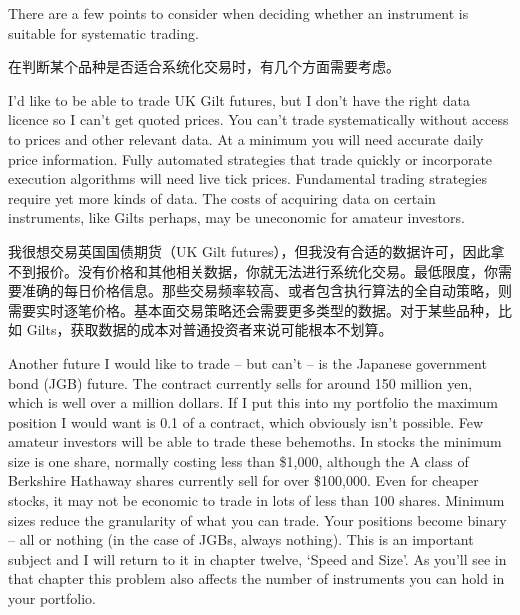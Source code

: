 
\begin{englishblock} There are a few points to consider when deciding whether an instrument is suitable for systematic trading. \end{englishblock}

\begin{chineseblock}在判断某个品种是否适合系统化交易时，有几个方面需要考虑。\end{chineseblock}


\begin{englishblock} I'd like to be able to trade UK Gilt futures, but I don't have the right data licence so I can't get quoted prices. You can't trade systematically without access to prices and other relevant data. At a minimum you will need accurate daily price information. Fully automated strategies that trade quickly or incorporate execution algorithms will need live tick prices. Fundamental trading strategies require yet more kinds of data. The costs of acquiring data on certain instruments, like Gilts perhaps, may be uneconomic for amateur investors. \end{englishblock}

\begin{chineseblock}我很想交易英国国债期货（UK Gilt futures），但我没有合适的数据许可，因此拿不到报价。没有价格和其他相关数据，你就无法进行系统化交易。最低限度，你需要准确的每日价格信息。那些交易频率较高、或者包含执行算法的全自动策略，则需要实时逐笔价格。基本面交易策略还会需要更多类型的数据。对于某些品种，比如 Gilts，获取数据的成本对普通投资者来说可能根本不划算。\end{chineseblock}


\begin{englishblock} Another future I would like to trade -- but can't -- is the Japanese government bond (JGB) future. The contract currently sells for around 150 million yen, which is well over a million dollars. If I put this into my portfolio the maximum position I would want is 0.1 of a contract, which obviously isn't possible. Few amateur investors will be able to trade these behemoths. In stocks the minimum size is one share, normally costing less than \$1,000, although the A class of Berkshire Hathaway shares currently sell for over \$100,000. Even for cheaper stocks, it may not be economic to trade in lots of less than 100 shares. Minimum sizes reduce the granularity of what you can trade. Your positions become binary -- all or nothing (in the case of JGBs, always nothing). This is an important subject and I will return to it in chapter twelve, ‘Speed and Size'. As you'll see in that chapter this problem also affects the number of instruments you can hold in your portfolio. \end{englishblock}

